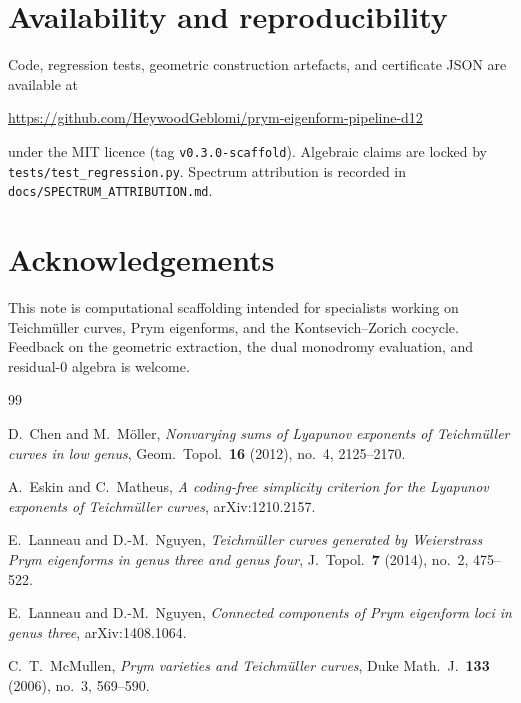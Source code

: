 \documentclass[11pt,a4paper]{article}
\theoremstyle{definition}
\begin{document}
\section{Availability and reproducibility}

Code, regression tests, geometric construction artefacts, and certificate JSON are available at
\begin{center}
\url{https://github.com/HeywoodGeblomi/prym-eigenform-pipeline-d12}
\end{center}
under the MIT licence (tag \texttt{v0.3.0-scaffold}).
Algebraic claims are locked by \texttt{tests/test\_regression.py}.
Spectrum attribution is recorded in \texttt{docs/SPECTRUM\_ATTRIBUTION.md}.

\section*{Acknowledgements}

This note is computational scaffolding intended for specialists working on Teichm\"uller curves, Prym eigenforms, and the Kontsevich--Zorich cocycle.
Feedback on the geometric extraction, the dual monodromy evaluation, and residual-0 algebra is welcome.

\begin{thebibliography}{99}

D.~Chen and M.~M\"oller,
\textit{Nonvarying sums of Lyapunov exponents of Teichm\"uller curves in low genus},
Geom.\ Topol.\ \textbf{16} (2012), no.~4, 2125--2170.

A.~Eskin and C.~Matheus,
\textit{A coding-free simplicity criterion for the Lyapunov exponents of Teichm\"uller curves},
arXiv:1210.2157.

E.~Lanneau and D.-M.~Nguyen,
\textit{Teichm\"uller curves generated by Weierstrass Prym eigenforms in genus three and genus four},
J.\ Topol.\ \textbf{7} (2014), no.~2, 475--522.

E.~Lanneau and D.-M.~Nguyen,
\textit{Connected components of Prym eigenform loci in genus three},
arXiv:1408.1064.

C.~T.~McMullen,
\textit{Prym varieties and Teichm\"uller curves},
Duke Math.\ J.\ \textbf{133} (2006), no.~3, 569--590.

\end{thebibliography}
\end{document}
